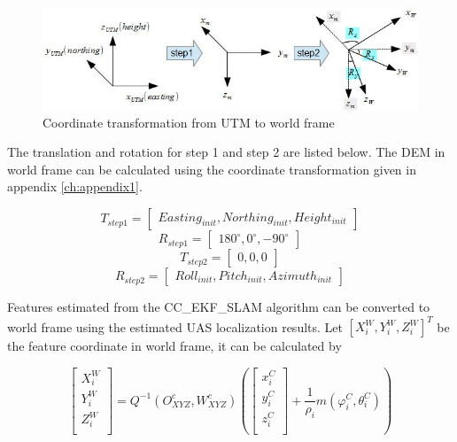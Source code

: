\begin{figure}[h]
  \centering
  \includegraphics[width=12cm,keepaspectratio=true]{./Figures/utm_to_world.jpg}
  \caption{Coordinate transformation from UTM to world frame}
  \label{fig:utm_to_world}
\end{figure}

\noindent The translation and rotation for step 1 and step 2 are listed below. The DEM in world frame can be calculated using the coordinate transformation given in appendix \ref{ch:appendix1}. 

$$T_{step1} = \begin{bmatrix}Easting_{init}, Northing_{init},
  Height_{init}\end{bmatrix}$$
$$R_{step1} = \begin{bmatrix}180^{\circ}, 0^{\circ},
  -90^{\circ}\end{bmatrix}$$
$$T_{step2} = \begin{bmatrix}0, 0, 0\end{bmatrix}$$
$$R_{step2} = \begin{bmatrix}Roll_{init}, Pitch_{init},
  Azimuth_{init}\end{bmatrix}$$

Features estimated from the CC\_EKF\_SLAM algorithm can be converted to world frame using the estimated UAS localization results. Let $[X_i^W,Y_i^W, Z_i^W]^T$ be the feature coordinate in world frame, it can be calculated by

\begin{equation}
  \left[ \begin{array}{c}
    X_{i}^{W}  \\
    Y_{i}^{W}  \\
    Z_{i}^{W}  \\
  \end{array} \right]=Q^{-1}(O_{XYZ}^{c}, W_{XYZ}^{c})\left(\left[
    \begin{array}{c}
      x_{i}^{C} \\
      y_{i}^{C} \\
      z_{i}^{C} \\
    \end{array}
  \right]+\frac{1}{\rho _{i}}m(\varphi _{i}^{C},\theta_{i}^{C})\right)
\end{equation}


